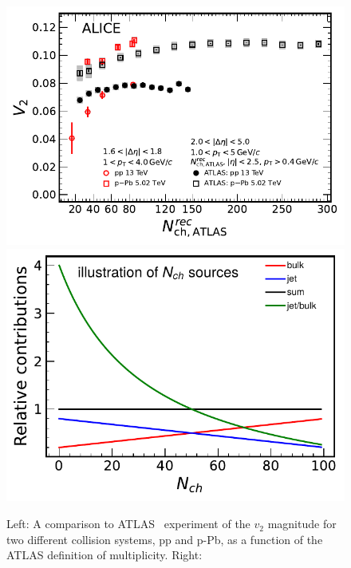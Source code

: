 %
\begin{figure}[h!]
	\centering
	\includegraphics[width=0.45 \textwidth]{figures/Fig7_v2Mult_allSystemsATLAS.pdf} 
	\includegraphics[width=0.425
	\textwidth]{figures/IllustrationNchSources.pdf} 
	\caption{Left: A comparison to ATLAS~\cite{Aaboud:2016yar} experiment of the $v_2$ magnitude for two different collision systems, pp and p-Pb, as a function of the ATLAS definition of multiplicity. Right:} 
	\label{fig:v2multATLAS}
\end{figure}

